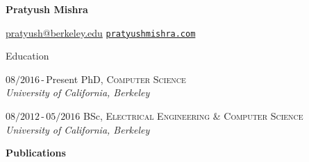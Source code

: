 \documentclass[11pt]{article}
\begin{document}
\nocite{*}


\setlength{\cvlabelwidth}{6.78em}
\setlength{\cvlabelskip}{%
0.2\baselineskip
}%

\begin{cv}{\vspace{-5em}}
  \begin{center}
    \huge
    \textbf{Pratyush Mishra}
  \end{center}

  \href{mailto:pratyush@berkeley.edu}{pratyush@berkeley.edu}\hfill
  \href{http://www.pratyushmishra.com}{\texttt{pratyushmishra.com}}

  \begin{cvlist}{Education}
  \item[\small$08/2016$\,-\,Present] PhD, \textsc{Computer Science}\\
    \emph{University of California, Berkeley}

  \item[\small$08/2012$\,-\,$05/2016$] BSc, \textsc{Electrical Engineering \& Computer Science}\\
    \emph{University of California, Berkeley}
  \end{cvlist}
  \vspace{-1em}
  {\large\textbf{Publications}}



\end{cv}
\end{document}
